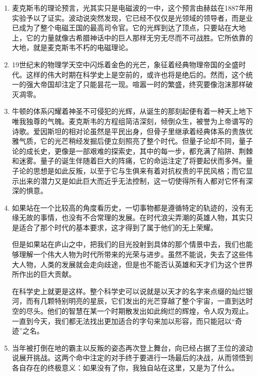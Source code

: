 \documentclass[UTF8]{ctexart}
\begin{document}
		\begin{enumerate}
		
			\item 麦克斯韦的理论预言，光其实只是电磁波的一中，这个预言由赫兹在1887年用实验予以了证实。波动说突然发现，它已经不仅仅是光领域的领导者，而是业已成为了整个电磁王国的最高司令官。它的光辉到达了顶点，只要站在大地上，它的力量就像古希腊神话中的巨人那样无穷无尽而不可战胜。它所依靠的大地，就是麦克斯韦不朽的电磁理论。
			
			\item 19世纪末的物理学天空中闪烁着金色的光芒，象征着经典物理帝国的全盛时代。这样的伟大时期在科学史上是空前的，或许也将是绝后的。然而，这个统一的强大帝国却注定了只能昙花一现。喧嚣一时的繁盛，终究要像泡沫那样破灭凋零。
			
			\item 牛顿的体系闪耀着神圣不可侵犯的光辉，从诞生的那刻起便有着一种天上地下唯我独尊的气魄。麦克斯韦的方程组简洁深刻，倾倒众生，被誉为上帝谱写的诗歌。爱因斯坦的相对论虽然是平民出身，但骨子里继承着经典体系的贵族优雅气质，它的光芒稍经发掘后便立刻照亮了整个时代。但量子论却不同，量子论的成长史，更像是一部艰难的探索史，其中的每一步，都充满了陷阱、荆棘和迷雾。量子的诞生伴随着巨大的阵痛，它的命运注定了将要起伏而多舛。量子论的思想是如此反叛，以至于它与生俱来有着对抗权贵的平民风格；而它显示出来的潜力又是如此巨大而近乎无法控制，这一切使得所有人都对它怀有深深的惧意。
			
			\item 如果站在一个比较高的角度看历史，一切事物都是遵循特定的轨迹的，没有无缘无故的事情，也没有不合常理的发展。在时代浪尖弄潮的英雄人物，其实只是适合了那个时代的基本要求，这才得到了属于他们的无上荣耀。
			
			但是如果站在庐山之中，把我们的目光投射到具体的那个情景中去，我们也能够理解一个伟大人物为时代所带来的光荣与进步。虽然不能说，失去了这些伟大人物，人类的发展就会走向歧途，但是也不能否认英雄和天才们为这个世界所作出的巨大贡献。
			
			在科学史上就更是这样。整个科学史可以说就是以天才的名字来点缀的灿烂银河，而有几颗特别明亮的星辰，它们发出的光芒穿越了整个宇宙，一直到达时空的尽头。他们的智慧在某一个时期散发出如此绚烂的辉煌，令人叹为观止。一直到今天，我们都无法找出更加适合的字句来加以形容，而只能冠以“奇迹”之名。
			
			\item 当年被打倒在地的霸主以反叛的姿态再次登上舞台，向已经占据了王位的波动说展开挑战。这两个命中注定的对手终于要进行一场最后的决战，从而领悟到各自存在的终极意义：如果没有了你，我独自站在这里，又是为了什么。
			

\end{enumerate}
\end{document}
